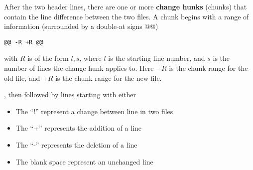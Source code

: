 After the two header lines, there are one or more {\bf change hunks}
(chunks) that contain the line difference between the two files. A
chunk begins with a range of information (surrounded by a double-at
signs @@)
\begin{verbatim}
@@ -R +R @@
\end{verbatim}
with $R$ is of the form $l,s$, where $l$ is the starting line number,
and $s$ is the number of lines the change hunk applies to. Here $-R$
is the chunk range for the old file, and $+R$ is the chunk range for
the new file. 


, then followed by lines starting with either
\begin{itemize}
\item The ``!'' represent a change between line in two files

\item The ``+'' represents the addition of a line

\item The ``-'' represents the deletion of a line
\item The blank space represent an unchanged line 
\end{itemize}
